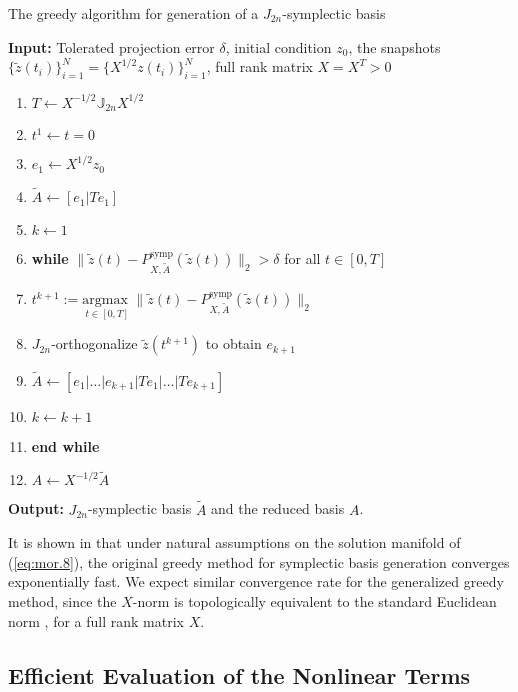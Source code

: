 \begin{algorithm} 
\caption{The greedy algorithm for generation of a $J_{2n}$-symplectic basis} \label{alg:2}
{\bf Input:} Tolerated projection error $\delta$, initial condition $ z_0$, the snapshots $\{\tilde z(t_i)\}_{i=1}^{N} = \{X^{1/2} z(t_i)\}_{i=1}^{N}$, full rank matrix $X=X^T>0$
\begin{enumerate}
\item $T \leftarrow X^{-1/2}\mathbb J_{2n} X^{1/2}$
\item $t^1 \leftarrow t=0$
\item $e_1 \leftarrow X^{1/2}z_0$
\item $\tilde A \leftarrow [e_1|Te_1]$
\item $k \leftarrow 1$
\item \textbf{while} $\| \tilde z(t) - P^\text{symp}_{X,\tilde A}( \tilde z(t) ) \|_2 > \delta$ for all $t \in [0,T]$
\item \hspace{0.5cm} $t^{k+1} := \underset{t\in [0,T]}{\text{argmax }} \| \tilde z(t) - P^\text{symp}_{X,\tilde A}( \tilde z(t) ) \|_2$
\item \hspace{0.5cm} $J_{2n}$-orthogonalize $ \tilde z(t^{k+1})$ to obtain $e_{k+1}$
\item \hspace{0.5cm} $\tilde A \leftarrow [e_1|\dots |e_{k+1} | Te_1|\dots| Te_{k+1}]$
\item \hspace{0.5cm} $k \leftarrow k+1$
\item \textbf{end while}
\item $A\leftarrow X^{-1/2} \tilde A$
\end{enumerate}
\vspace{0.5cm}
{\bf Output:} $J_{2n}$-symplectic basis $\tilde A$ and the reduced basis $A$.
\end{algorithm}

It is shown in \cite{doi:10.1137/17M1111991} that under natural assumptions on the solution manifold of (\ref{eq:mor.8}), the original greedy method for symplectic basis generation converges exponentially fast. We expect similar convergence rate for the generalized greedy method, since the $X$-norm is topologically equivalent to the standard Euclidean norm \cite{friedman1970foundations}, for a full rank matrix $X$.

\subsection{Efficient Evaluation of the Nonlinear Terms} \label{sec:normmor.3}
